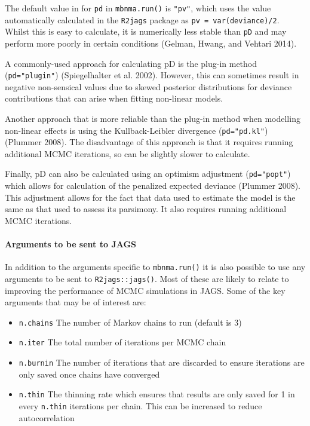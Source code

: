 \documentclass[]{article}
\providecommand{\tightlist}{%
  \setlength{\itemsep}{0pt}\setlength{\parskip}{0pt}}
\let\oldparagraph\paragraph
\renewcommand{\paragraph}[1]{\oldparagraph{#1}\mbox{}}
\begin{document}
The default value in for \texttt{pd} in \texttt{mbnma.run()} is
\texttt{"pv"}, which uses the value automatically calculated in the
\texttt{R2jags} package as \texttt{pv\ =\ var(deviance)/2}. Whilst this
is easy to calculate, it is numerically less stable than \texttt{pD} and
may perform more poorly in certain conditions (Gelman, Hwang, and
Vehtari 2014).

A commonly-used approach for calculating pD is the plug-in method
(\texttt{pd="plugin"}) (Spiegelhalter et al. 2002). However, this can
sometimes result in negative non-sensical values due to skewed posterior
distributions for deviance contributions that can arise when fitting
non-linear models.

Another approach that is more reliable than the plug-in method when
modelling non-linear effects is using the Kullback-Leibler divergence
(\texttt{pd="pd.kl"}) (Plummer 2008). The disadvantage of this approach
is that it requires running additional MCMC iterations, so can be
slightly slower to calculate.

Finally, pD can also be calculated using an optimism adjustment
(\texttt{pd="popt"}) which allows for calculation of the penalized
expected deviance (Plummer 2008). This adjustment allows for the fact
that data used to estimate the model is the same as that used to assess
its parsimony. It also requires running additional MCMC iterations.

\hypertarget{arguments-to-be-sent-to-jags}{%
\paragraph{Arguments to be sent to
JAGS}\label{arguments-to-be-sent-to-jags}}

In addition to the arguments specific to \texttt{mbnma.run()} it is also
possible to use any arguments to be sent to \texttt{R2jags::jags()}.
Most of these are likely to relate to improving the performance of MCMC
simulations in JAGS. Some of the key arguments that may be of interest
are:

\begin{itemize}
\tightlist
\item
  \texttt{n.chains} The number of Markov chains to run (default is 3)
\item
  \texttt{n.iter} The total number of iterations per MCMC chain
\item
  \texttt{n.burnin} The number of iterations that are discarded to
  ensure iterations are only saved once chains have converged
\item
  \texttt{n.thin} The thinning rate which ensures that results are only
  saved for 1 in every \texttt{n.thin} iterations per chain. This can be
  increased to reduce autocorrelation
\end{itemize}
\end{document}
